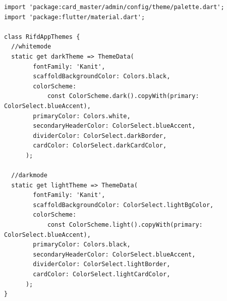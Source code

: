 \begin{lstlisting}[caption=Definiton der App Themes,style=goMono]
import 'package:card_master/admin/config/theme/palette.dart';
import 'package:flutter/material.dart';

class RifdAppThemes {
  //whitemode
  static get darkTheme => ThemeData(
        fontFamily: 'Kanit',
        scaffoldBackgroundColor: Colors.black,
        colorScheme:
            const ColorScheme.dark().copyWith(primary: ColorSelect.blueAccent),
        primaryColor: Colors.white,
        secondaryHeaderColor: ColorSelect.blueAccent,
        dividerColor: ColorSelect.darkBorder,
        cardColor: ColorSelect.darkCardColor,
      );

  //darkmode
  static get lightTheme => ThemeData(
        fontFamily: 'Kanit',
        scaffoldBackgroundColor: ColorSelect.lightBgColor,
        colorScheme:
            const ColorScheme.light().copyWith(primary: ColorSelect.blueAccent),
        primaryColor: Colors.black,
        secondaryHeaderColor: ColorSelect.blueAccent,
        dividerColor: ColorSelect.lightBorder,
        cardColor: ColorSelect.lightCardColor,
      );
}
\end{lstlisting} 

\newpage

